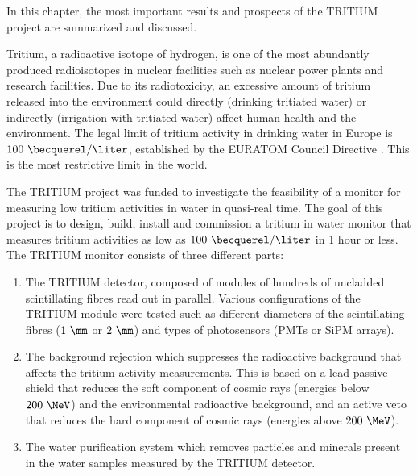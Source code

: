 In this chapter, the most important results and prospects of the TRITIUM project are summarized and discussed. 

Tritium, a radioactive isotope of hydrogen, is one of the most abundantly produced radioisotopes in nuclear facilities such as nuclear power plants and research facilities. Due to its radiotoxicity, an excessive amount of tritium released into the environment could directly (drinking tritiated water) or indirectly (irrigation with tritiated water) affect human health and the environment. The legal limit of tritium activity in drinking water in Europe is $100~\becquerel/\liter$, established by the EURATOM Council Directive \cite{EURATOM_GL}. This is the most restrictive limit in the world. %

The TRITIUM project was funded to investigate the feasibility of a monitor 
for measuring low tritium activities in water in quasi-real time. The goal of this project is to design, build, install and commission a tritium in water monitor that measures tritium activities as low as $100~\becquerel/\liter$ in 1 hour or less. The TRITIUM monitor consists of three different parts:

\begin{enumerate}

\item{} The TRITIUM detector, composed of modules of hundreds of uncladded scintillating fibres read out in parallel. Various configurations of the TRITIUM module were tested such as different diameters of the scintillating fibres ($1~\mm$ or $2~\mm$) and types of photosensors (PMTs or SiPM arrays).

\item{} The background rejection which suppresses the radioactive background that affects the tritium activity measurements. This is based on a lead passive shield that reduces the soft component of cosmic rays (energies below $200~\MeV$) and the environmental radioactive background, and an active veto that reduces the hard component of cosmic rays (energies above $200~\MeV$).

\item{} The water purification system which removes particles and minerals present in the water samples measured by the TRITIUM detector.

\end{enumerate} 

